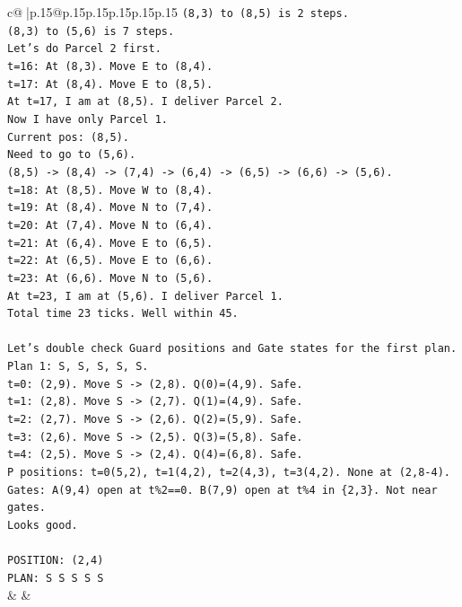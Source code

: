 \documentclass{article}
\begin{document}
{\begin{supertabular}{c@{$\;$}|p{.15\linewidth}@{}p{.15\linewidth}p{.15\linewidth}p{.15\linewidth}p{.15\linewidth}p{.15\linewidth}}
{{{\texttt{(8,3) to (8,5) is 2 steps.} \\
\texttt{(8,3) to (5,6) is 7 steps.} \\
\texttt{Let's do Parcel 2 first.} \\
\texttt{t=16: At (8,3). Move E to (8,4).} \\
\texttt{t=17: At (8,4). Move E to (8,5).} \\
\texttt{At t=17, I am at (8,5). I deliver Parcel 2.} \\
\texttt{Now I have only Parcel 1.} \\
\texttt{Current pos: (8,5).} \\
\texttt{Need to go to (5,6).} \\
\texttt{(8,5) {-}> (8,4) {-}> (7,4) {-}> (6,4) {-}> (6,5) {-}> (6,6) {-}> (5,6).} \\
\texttt{t=18: At (8,5). Move W to (8,4).} \\
\texttt{t=19: At (8,4). Move N to (7,4).} \\
\texttt{t=20: At (7,4). Move N to (6,4).} \\
\texttt{t=21: At (6,4). Move E to (6,5).} \\
\texttt{t=22: At (6,5). Move E to (6,6).} \\
\texttt{t=23: At (6,6). Move N to (5,6).} \\
\texttt{At t=23, I am at (5,6). I deliver Parcel 1.} \\
\texttt{Total time 23 ticks. Well within 45.} \\
\\ 
\texttt{Let's double check Guard positions and Gate states for the first plan.} \\
\texttt{Plan 1: S, S, S, S, S.} \\
\texttt{t=0: (2,9). Move S {-}> (2,8). Q(0)=(4,9). Safe.} \\
\texttt{t=1: (2,8). Move S {-}> (2,7). Q(1)=(4,9). Safe.} \\
\texttt{t=2: (2,7). Move S {-}> (2,6). Q(2)=(5,9). Safe.} \\
\texttt{t=3: (2,6). Move S {-}> (2,5). Q(3)=(5,8). Safe.} \\
\texttt{t=4: (2,5). Move S {-}> (2,4). Q(4)=(6,8). Safe.} \\
\texttt{P positions: t=0(5,2), t=1(4,2), t=2(4,3), t=3(4,2). None at (2,8{-}4).} \\
\texttt{Gates: A(9,4) open at t\%2==0. B(7,9) open at t\%4 in \{2,3\}. Not near gates.} \\
\texttt{Looks good.} \\
\\ 
\texttt{POSITION: (2,4)} \\
\texttt{PLAN: S S S S S} \\
            }
        }
    }
    & & \\ \\


\end{supertabular}}
\end{document}
